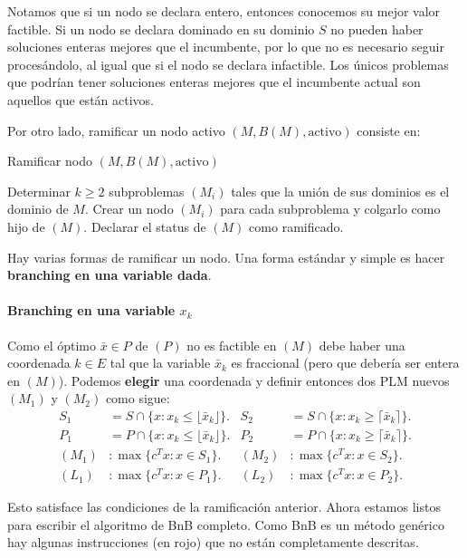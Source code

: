     Notamos que si un nodo se declara entero, entonces conocemos su mejor valor factible. Si un nodo se declara dominado en su dominio $S$ no pueden haber soluciones enteras mejores que el incumbente, por lo que no es necesario seguir procesándolo, al igual que si el nodo se declara infactible. Los únicos problemas que podrían tener soluciones enteras mejores que el incumbente actual son aquellos que están activos.
    
    Por otro lado, ramificar un nodo activo $(M,B(M),\text{activo})$ consiste en:
    \begin{algorithm}[H]
    	\caption{Ramificar nodo $(M,B(M),\text{activo})$}
    	\label{alg:bnb}
    	\begin{algorithmic}[1] 
    		\State Determinar $k\geq 2$ subproblemas $(M_i)$ tales que la unión de sus dominios es el dominio de $M$.
    		\State Crear un nodo $(M_i)$ para cada subproblema y colgarlo como hijo de $(M)$.
    		\State Declarar el status de $(M)$ como ramificado.
    	\end{algorithmic}
    \end{algorithm} 
    
    Hay varias formas de ramificar un nodo. Una forma estándar y simple es hacer \textbf{branching en una variable dada}. 
    
    \paragraph{Branching en una variable $x_k$} Como el óptimo $\bar{x}\in P$ de $(P)$ no es factible en $(M)$ debe haber una coordenada $k\in E$ tal que la variable $\bar{x}_k$ es fraccional (pero que debería ser entera en $(M)$). Podemos \textbf{elegir} una coordenada y definir entonces dos PLM nuevos $(M_1)$ y $(M_2)$ como sigue:
    \begin{align*}
    S_1&=S\cap \{x\colon x_k \leq \lfloor \bar{x}_k \rfloor\}. &S_2&=S\cap \{x\colon x_k \geq \lceil \bar{x}_k \rceil\}.\\
    P_1&= P \cap \{x\colon x_k \leq \lfloor \bar{x}_k \rfloor\}. &P_2&= P \cap \{x\colon x_k \geq \lceil \bar{x}_k \rceil\}.\\
    (M_1)&\colon \max\{c^Tx\colon x\in S_1\}. & (M_2)&\colon \max\{c^Tx\colon x\in S_2\}.\\
    (L_1)&\colon \max\{c^Tx\colon x\in P_1\}. & (L_2)&\colon \max\{c^Tx\colon x\in P_2\}.
    \end{align*}
    
    Esto satisface las condiciones de la ramificación anterior. Ahora estamos listos para escribir el algoritmo de BnB completo. Como BnB es un método genérico hay algunas instrucciones (en rojo) que no están completamente descritas. 
    
